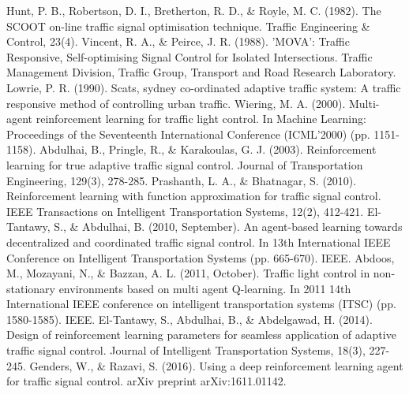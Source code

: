 \documentclass[conference]{IEEEtran}
\begin{document}
%
%
%
\begin{thebibliography}{1}
 Hunt, P. B., Robertson, D. I., Bretherton, R. D., \& Royle, M. C. (1982). The SCOOT on-line traffic signal optimisation technique. Traffic Engineering \& Control, 23(4).
 Vincent, R. A., \& Peirce, J. R. (1988). 'MOVA': Traffic Responsive, Self-optimising Signal Control for Isolated Intersections. Traffic Management Division, Traffic Group, Transport and Road Research Laboratory.
 Lowrie, P. R. (1990). Scats, sydney co-ordinated adaptive traffic system: A traffic responsive method of controlling urban traffic.
 Wiering, M. A. (2000). Multi-agent reinforcement learning for traffic light control. In Machine Learning: Proceedings of the Seventeenth International Conference (ICML'2000) (pp. 1151-1158).
 Abdulhai, B., Pringle, R., \& Karakoulas, G. J. (2003). Reinforcement learning for true adaptive traffic signal control. Journal of Transportation Engineering, 129(3), 278-285.
 Prashanth, L. A., \& Bhatnagar, S. (2010). Reinforcement learning with function approximation for traffic signal control. IEEE Transactions on Intelligent Transportation Systems, 12(2), 412-421.
 El-Tantawy, S., \& Abdulhai, B. (2010, September). An agent-based learning towards decentralized and coordinated traffic signal control. In 13th International IEEE Conference on Intelligent Transportation Systems (pp. 665-670). IEEE.
 Abdoos, M., Mozayani, N., \& Bazzan, A. L. (2011, October). Traffic light control in non-stationary environments based on multi agent Q-learning. In 2011 14th International IEEE conference on intelligent transportation systems (ITSC) (pp. 1580-1585). IEEE.
 El-Tantawy, S., Abdulhai, B., \& Abdelgawad, H. (2014). Design of reinforcement learning parameters for seamless application of adaptive traffic signal control. Journal of Intelligent Transportation Systems, 18(3), 227-245.
 Genders, W., \& Razavi, S. (2016). Using a deep reinforcement learning agent for traffic signal control. arXiv preprint arXiv:1611.01142.

\end{thebibliography}
\end{document}
